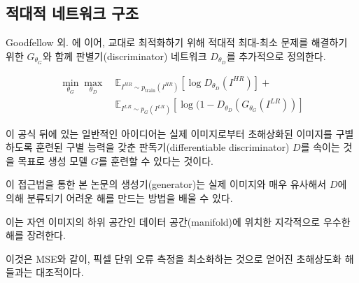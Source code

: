\documentclass[10pt,twocolumn,letterpaper]{article}
\newcommand{\kor}[1]{#1}
\newcommand{\eng}[1]{}
\newcommand{\summary}[1]{}
\begin{document}
\subsection{\eng{Adversarial network architecture}\kor{적대적 네트워크 구조}}
\eng{
Following Goodfellow et al. \cite{Goodfellow14GAN} we further define a discriminator network $D_{\theta_D}$ which we optimize in an alternating manner along with $G_{\theta_G}$ to solve the adversarial min-max problem:
}\kor{
Goodfellow 외. \cite{Goodfellow14GAN}에 이어, 교대로 최적화하기 위해 적대적 최대-최소 문제를 해결하기 위한 $G_{\theta_G}$와 함께 판별기(discriminator) 네트워크 $D_{\theta_D}$를 추가적으로 정의한다.
}
\begin{equation}
\label{eq:minmax}
\begin{split}
\min_{\theta_G} \max_{\theta_D} ~& \mathbb{E}_{I^{HR}\sim p_\textrm{train}(I^{HR})} [ \log D_{\theta_D}(I^{HR}) ] + \\
& \mathbb{E}_{I^{LR}\sim p_G(I^{LR})} [ \log (1-D_{\theta_D}(G_{\theta_G}(I^{LR})) ]
\end{split}
\end{equation}

\summary{
판별기 네트워크의 구조
}

\eng{
The general idea behind this formulation is that it allows one to train a generative model $G$ with the goal of fooling a differentiable discriminator $D$ that is trained to distinguish super-resolved images from real images.
}\kor{
이 공식 뒤에 있는 일반적인 아이디어는 실제 이미지로부터 초해상화된 이미지를 구별하도록 훈련된 구별 능력을 갖춘 판독기(differentiable discriminator) $D$를 속이는 것을 목표로 생성 모델 $G$를 훈련할 수 있다는 것이다.
}
\eng{
With this approach our generator can learn to create solutions that are highly similar to real images and thus difficult to classify by $D$.
}\kor{
이 접근법을 통한 본 논문의 생성기(generator)는 실제 이미지와 매우 유사해서 $D$에 의해 분류되기 어려운 해를 만드는 방법을 배울 수 있다.
} \eng{
This encourages perceptually superior solutions residing in the subspace, the manifold, of natural images.
}\kor{
이는 자연 이미지의 하위 공간인 데이터 공간(manifold)에 위치한 지각적으로 우수한 해를 장려한다.
} \eng{
This is in contrast to \ac{SR} solutions obtained by minimizing pixel-wise error measurements, such as the \ac{MSE}.
}\kor{
이것은 \ac{MSE}와 같이, 픽셀 단위 오류 측정을 최소화하는 것으로 얻어진 \ac{초해상도화} 해들과는 대조적이다.
}

\summary{
GAN은 실제 이미지와 매우 유사한 해를 만들어 판독기 $D$를 속이는 것으로 학습하며, 지각적으로 우수한 해를 장려함. 이 해들은 MSE처럼 픽셀 단위 오류 측정을 최소화하여 얻은 해들과는 대조적임.
}
\end{document}
